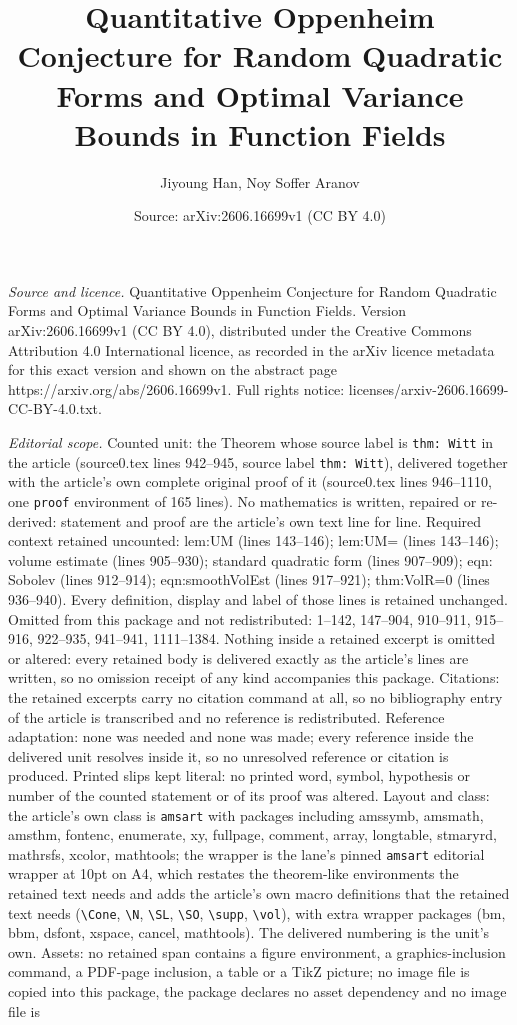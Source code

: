 \documentclass[10pt,a4paper]{amsart}
\title[Quantitative Oppenheim Conjecture for Random Quadratic Forms]{Quantitative Oppenheim Conjecture for Random Quadratic Forms and Optimal Variance Bounds in Function Fields}
\author{Jiyoung Han, Noy Soffer Aranov}
\date{Source: arXiv:2606.16699v1 (CC BY 4.0)}
\begin{document}
\maketitle

\noindent\emph{Source and licence.} Quantitative Oppenheim Conjecture for Random Quadratic Forms and Optimal Variance Bounds in Function Fields. Version arXiv:2606.16699v1 (CC BY 4.0), distributed under the Creative Commons Attribution 4.0 International licence, as recorded in the arXiv licence metadata for this exact version and shown on the abstract page https://arxiv.org/abs/2606.16699v1. Full rights notice: licenses/arxiv-2606.16699-CC-BY-4.0.txt.\par\smallskip

\noindent\textit{Editorial scope.} Counted unit: the Theorem whose source label is \texttt{thm: Witt} in the article (source0.tex lines 942--945, source label \texttt{thm: Witt}), delivered together with the article's own complete original proof of it (source0.tex lines 946--1110, one \texttt{proof} environment of 165 lines). No mathematics is written, repaired or re-derived: statement and proof are the article's own text line for line. Required context retained uncounted: lem:UM (lines 143--146); lem:UM= (lines 143--146); volume estimate (lines 905--930); standard quadratic form (lines 907--909); eqn: Sobolev (lines 912--914); eqn:smoothVolEst (lines 917--921); thm:VolR=0 (lines 936--940). Every definition, display and label of those lines is retained unchanged. Omitted from this package and not redistributed: 1--142, 147--904, 910--911, 915--916, 922--935, 941--941, 1111--1384. Nothing inside a retained excerpt is omitted or altered: every retained body is delivered exactly as the article's lines are written, so no omission receipt of any kind accompanies this package. Citations: the retained excerpts carry no citation command at all, so no bibliography entry of the article is transcribed and no reference is redistributed. Reference adaptation: none was needed and none was made; every reference inside the delivered unit resolves inside it, so no unresolved reference or citation is produced. Printed slips kept literal: no printed word, symbol, hypothesis or number of the counted statement or of its proof was altered. Layout and class: the article's own class is \texttt{amsart} with packages including amssymb, amsmath, amsthm, fontenc, enumerate, xy, fullpage, comment, array, longtable, stmaryrd, mathrsfs, xcolor, mathtools; the wrapper is the lane's pinned \texttt{amsart} editorial wrapper at 10pt on A4, which restates the theorem-like environments the retained text needs and adds the article's own macro definitions that the retained text needs (\texttt{\textbackslash Cone}, \texttt{\textbackslash N}, \texttt{\textbackslash SL}, \texttt{\textbackslash SO}, \texttt{\textbackslash supp}, \texttt{\textbackslash vol}), with extra wrapper packages (bm, bbm, dsfont, xspace, cancel, mathtools). The delivered numbering is the unit's own. Assets: no retained span contains a figure environment, a graphics-inclusion command, a PDF-page inclusion, a table or a TikZ picture; no image file is copied into this package, the package declares no asset dependency and no image file is 
\end{document}

